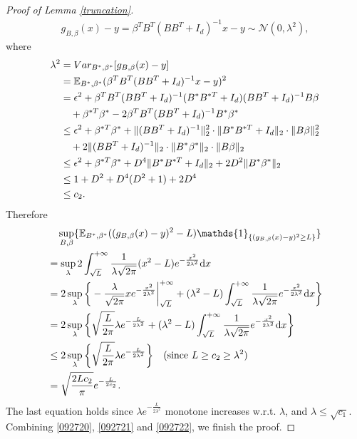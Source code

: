 \begin{proof}[Proof of Lemma \ref{truncation}]
\begin{align}
g_{B,\beta}(x)-y = \beta^{T}B^{T}(BB^{T}+I_{d})^{-1}x-y \sim \mathcal{N}(0, \lambda^{2}),
\end{align}
where 
\begin{align}
\lambda^{2}&=  Var_{B^{*},\beta^{*}} [g_{B,\beta}(x)-y]  \notag \\
&=\mathbb{E}_{B^{*},\beta^{*}} (\beta^{T}B^{T}(BB^{T}+I_{d})^{-1}x-y)^{2} \notag \\
&= \epsilon^{2}+\beta^{T}B^{T}(BB^{T}+I_{d})^{-1} (B^{*}B^{* T}+I_{d})(BB^{T}+I_{d})^{-1}B\beta \notag \\
&\quad + \beta^{* T}\beta^{*}- 2\beta^{T}B^{T}(BB^{T}+I_{d})^{-1}B^{*}\beta^{*} \notag \\
& \leq \epsilon^{2}+\beta^{* T}\beta^{*} + \|(BB^{T}+I_{d})^{-1}\|_{2}^{2} \cdot \|B^{*}B^{* T}+I_{d} \|_{2} \cdot \|B\beta\|_{2}^{2} \notag \\
&\quad + 2 \|(BB^{T}+I_{d})^{-1}\|_{2} \cdot \|B^{*}\beta^{*}\|_{2} \cdot  \|B\beta\|_{2} \notag \\
& \leq \epsilon^{2}+ \beta^{* T}\beta^{*} + D^{4} \|B^{*}B^{* T}+I_{d} \|_{2} + 2D^{2} \|B^{*}\beta^{*}\|_{2} \notag \\
& \leq 1+ D^{2} + D^{4}(D^{2}+1)+2D^{4} \notag \\
& \leq c_{2}.
\end{align}
Therefore 
\begin{align}\label{092722}
& \quad \sup_{B,\beta} \{\mathbb{E}_{B^{*},\beta^{*}} ((g_{B,\beta}(x)-y)^{2}-L) \mathds{1}_{\{(g_{B,\beta}(x)-y)^{2} \geq L\}}  \}   \notag \\
&= \sup_{\lambda} 2\int_{\sqrt{L}}^{+\infty}\frac{1}{\lambda\sqrt{2\pi}}(x^{2}-L)e^{-\frac{x^{2}}{2\lambda^{2}}} \mathrm{d}x \notag \\
&= 2\sup_{\lambda} \bigg\{ -\frac{\lambda}{\sqrt{2\pi}}xe^{-\frac{x^{2}}{2\lambda^{2}}} \bigg|_{\sqrt{L}}^{+\infty} + (\lambda^{2}-L) \int_{\sqrt{L}}^{+\infty}\frac{1}{\lambda\sqrt{2\pi}}e^{-\frac{x^{2}}{2\lambda^{2}}}  \mathrm{d}x \bigg\} \notag \\
& = 2\sup_{\lambda} \bigg\{ \sqrt{\frac{L}{2\pi}} \lambda e^{-\frac{L}{2\lambda^{2}}} + (\lambda^{2}-L) \int_{\sqrt{L}}^{+\infty}\frac{1}{\lambda\sqrt{2\pi}}e^{-\frac{x^{2}}{2\lambda^{2}}}  \mathrm{d}x \bigg\} \notag \\
& \leq 2\sup_{\lambda} \bigg\{ \sqrt{\frac{L}{2\pi}} \lambda e^{-\frac{L}{2\lambda^{2}}} \bigg\} \quad (\text{since }L \geq c_{2} \geq \lambda^{2}) \notag \\
&= \sqrt{\frac{2L c_{2}}{\pi}} e^{-\frac{L}{2c_{2}}}.
\end{align}
The last equation holds since $\lambda e^{-\frac{L}{2\lambda^{2}}}$ monotone increases w.r.t. $\lambda$, and $\lambda \leq \sqrt{c_{1}}$. Combining \eqref{092720}, \eqref{092721} and \eqref{092722}, we finish the proof.
\end{proof}



